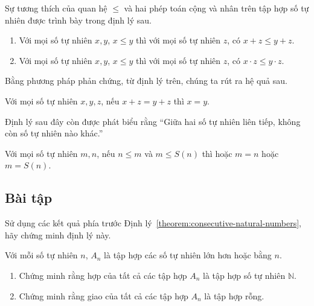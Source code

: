 Sự tương thích của quan hệ $\leq$ và hai phép toán cộng và nhân trên tập hợp số tự nhiên được trình bày trong định lý sau.
\begin{theorem}\label{theorem:natural-numbers-order}
    \begin{enumerate}[label={(\roman*)}]
        \item Với mọi số tự nhiên $x, y$, $x\leq y$ thì với mọi số tự nhiên $z$, có $x + z\leq y + z$.
        \item Với mọi số tự nhiên $x, y$, $x\leq y$ thì với mọi số tự nhiên $z$, có $x\cdot z\leq y\cdot z$.
    \end{enumerate}
\end{theorem}

Bằng phương pháp phản chứng, từ định lý trên, chúng ta rút ra hệ quả sau.
\begin{corollary}\label{corollary:addition-cancellation}
    Với mọi số tự nhiên $x, y, z$, nếu $x + z = y + z$ thì $x = y$.
\end{corollary}

Định lý sau đây còn được phát biểu rằng ``Giữa hai số tự nhiên liên tiếp, không còn số tự nhiên nào khác.''
\begin{theorem}\label{theorem:consecutive-natural-numbers}
    Với mọi số tự nhiên $m, n$, nếu $n\leq m$ và $m \leq S(n)$ thì hoặc $m = n$ hoặc $m = S(n)$.
\end{theorem}

\subsection{Bài tập}

\begin{exercise}
    Sử dụng các kết quả phía trước Định lý~\ref{theorem:consecutive-natural-numbers}, hãy chứng minh định lý này.
\end{exercise}

\begin{exercise}
    Với mỗi số tự nhiên $n$, $A_{n}$ là tập hợp các số tự nhiên lớn hơn hoặc bằng $n$.
    \begin{enumerate}[label={(\roman*)}]
        \item Chứng minh rằng hợp của tất cả các tập hợp $A_{n}$ là tập hợp số tự nhiên $\mathbb{N}$.
        \item Chứng minh rằng giao của tất cả các tập hợp $A_{n}$ là tập hợp rỗng.
    \end{enumerate}
\end{exercise}

